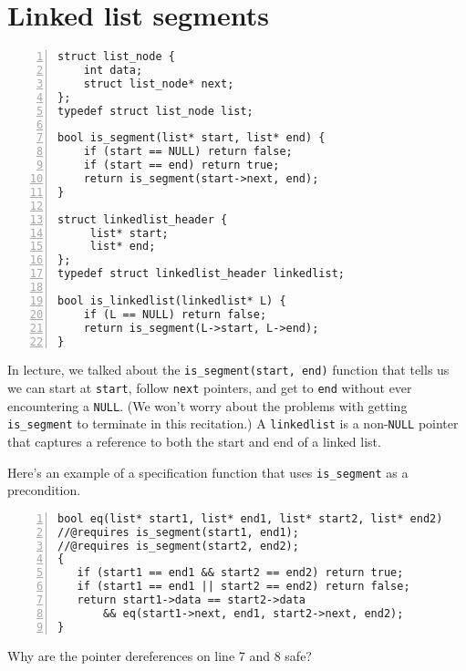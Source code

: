 \section*{Linked list segments%
}
\begin{lstlisting}[numbers=left]
struct list_node {
    int data;
    struct list_node* next;
};
typedef struct list_node list;

bool is_segment(list* start, list* end) {
    if (start == NULL) return false;
    if (start == end) return true;
    return is_segment(start->next, end);
}

struct linkedlist_header {
     list* start;
     list* end;
};
typedef struct linkedlist_header linkedlist;

bool is_linkedlist(linkedlist* L) {
    if (L == NULL) return false;
    return is_segment(L->start, L->end);
}
\end{lstlisting}

In lecture, we talked about the \lstinline'is_segment(start, end)'
function that tells us we can start at \lstinline'start', follow
\lstinline'next' pointers, and get to \lstinline'end' without ever
encountering a \lstinline'NULL'. (We won't worry about the problems
with getting \lstinline'is_segment' to terminate in this recitation.)
A \lstinline'linkedlist' is a non-\lstinline'NULL' pointer that
captures a reference to both the start and end of a linked list.

Here's an example of a specification function that uses
\lstinline'is_segment' as a precondition.

\begin{lstlisting}[numbers=left]
bool eq(list* start1, list* end1, list* start2, list* end2)
//@requires is_segment(start1, end1);
//@requires is_segment(start2, end2);
{
   if (start1 == end1 && start2 == end2) return true;
   if (start1 == end1 || start2 == end2) return false;
   return start1->data == start2->data
       && eq(start1->next, end1, start2->next, end2);
}
\end{lstlisting}
Why are the pointer dereferences on line 7 and 8 safe?

